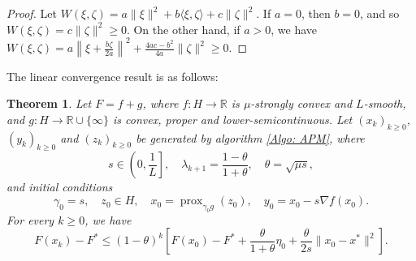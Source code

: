 \documentclass[pdflatex,sn-mathphys-num]{sn-jnl}
\theoremstyle{thmstyleone}
\newtheorem{theorem}{Theorem}
\theoremstyle{thmstyletwo}
\theoremstyle{thmstylethree}
\DeclareMathOperator{\prox}{prox}
\begin{document}
\begin{proof}
Let $W(\xi,\zeta) = a\| \xi \|^2 + b\langle \xi,\zeta \rangle + c\| \zeta \|^2$. If $a=0$, then $b=0$, and so $W(\xi,\zeta) = c\| \zeta \|^2 \ge 0$. On the other hand, if $a> 0$, we have $W(\xi,\zeta) = a \left\| \xi + \frac{b\zeta}{2a} \right\|^2 + \frac{4ac-b^2}{4a}\| \zeta \|^2 \ge 0$. 
\end{proof} 


The linear convergence result is as follows:

\begin{theorem}
Let $F=f+g$, where $f:H\to\mathbb{R}$ is $\mu$-strongly convex and $L$-smooth, and $g:H\to\mathbb{R}\cup\{\infty\}$ is convex, proper and lower-semicontinuous. Let $(x_k)_{k\ge 0}$, $(y_k)_{k\ge 0}$ and $(z_k)_{k\ge 0}$ be generated by algorithm \eqref{Algo: APM}, where
$$ s\in\left( 0,\frac{1}{L} \right],\quad \lambda_{k+1} = \frac{1-\theta}{1+\theta},\quad \theta = \sqrt{\mu s}, $$ 
and initial conditions
$$ \gamma_0 = s,\quad z_0\in H,\quad x_0=\prox_{\gamma_0g}(z_0),\quad y_0=x_0-s\nabla f(x_0).$$
For every $k\ge 0$, we have
$$ F(x_k) - F^* \le (1-\theta)^k\left[ F(x_0) - F^* + \frac{\theta}{1+\theta}\eta_0 + \frac{\theta}{2s}\| x_0 - x^* \|^2 \right]. $$
\end{theorem}
\end{document}
